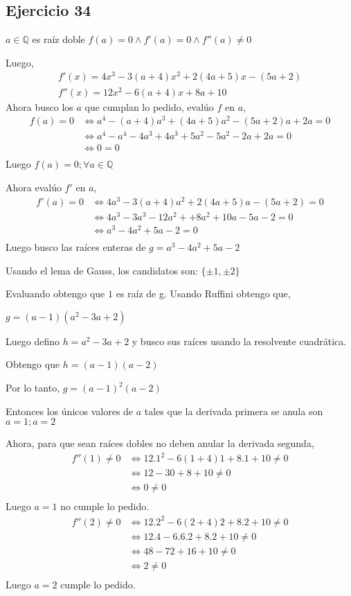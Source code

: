 \subsection{Ejercicio 34}

$ a \in \mathbb{Q} $ es raíz doble $ f(a) =  0 \wedge f'(a) = 0 \wedge f''(a) \neq 0 $

Luego,
\begin{align*}
    f'(x) = 4x^3 - 3(a+4)x^2 + 2(4a+5)x-(5a+2) \\
    f''(x) = 12x^2 - 6(a+4)x + 8a + 10
\end{align*}
Ahora busco los $ a $ que cumplan lo pedido, evalúo $f$ en $a$,
\begin{align*}
    f(a) = 0 &\iff a^4 - (a+4)a^3 + (4a+5)a^2 - (5a+2)a + 2a = 0 \\
    &\iff a^4 - a^4 - 4a^3 + 4a^3 + 5a^2 - 5a^2 -2a + 2a = 0 \\
    &\iff 0 = 0 \\
\end{align*}
Luego $ f(a) = 0; \forall a \in \mathbb{Q} $

Ahora evalúo $f'$ en $a$,
\begin{align*}
    f'(a) = 0 &\iff 4a^3 - 3(a+4)a^2 + 2(4a+5)a-(5a+2) = 0 \\ 
    &\iff 4a^3 - 3a^3 - 12a^2 + +8a^2 + 10a -5a - 2 = 0 \\ 
    &\iff a^3 - 4a^2 + 5a - 2 = 0 \\ 
\end{align*}
Luego busco las raíces enteras de $ g = a^3 - 4a^2 + 5a - 2 $

Usando el lema de Gauss, los candidatos son: $ \{ \pm 1, \pm 2 \} $

Evaluando obtengo que $1$ es raíz de g. Usando Ruffini obtengo que,

$ g = (a-1)(a^2-3a+2) $

Luego defino $ h = a^2-3a+2 $ y busco sus raíces usando la resolvente cuadrática.

Obtengo que $ h = (a-1)(a-2) $

Por lo tanto, $ g = (a-1)^2(a-2) $

Entonces los únicos valores de $a$ tales que la derivada primera se anula son $ a = 1; a = 2 $

Ahora, para que sean raíces dobles no deben anular la derivada segunda,
\begin{align*}
    f''(1) \neq 0 &\iff 12.1^2 - 6(1+4)1 + 8.1 + 10 \neq 0 \\
    &\iff 12 - 30 + 8 + 10 \neq 0 \\
    &\iff 0 \neq 0 \\
\end{align*}
Luego $ a = 1 $ no cumple lo pedido.
\begin{align*}
    f''(2) \neq 0 &\iff 12.2^2 - 6(2+4)2 + 8.2 + 10 \neq 0 \\
    &\iff 12.4 - 6.6.2 + 8.2 + 10 \neq 0 \\
    &\iff 48 - 72 + 16 + 10 \neq 0 \\
    &\iff 2 \neq 0 \\
\end{align*}
Luego $ a = 2 $ cumple lo pedido.

